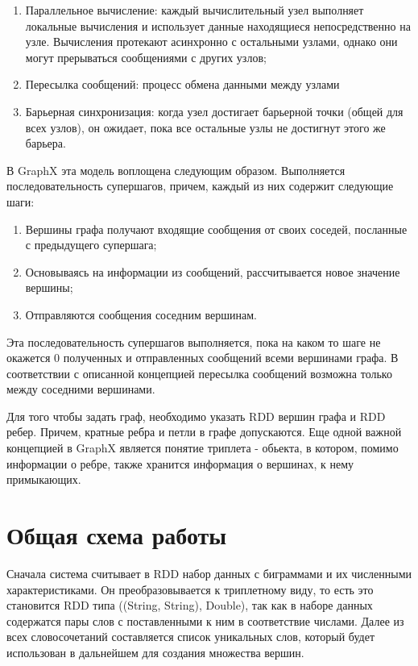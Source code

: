 \begin{enumerate}
  \item Параллельное вычисление: каждый вычислительный узел выполняет локальные
    вычисления и использует данные находящиеся непосредственно на узле.
    Вычисления протекают асинхронно с остальными узлами, однако они могут
    прерываться сообщениями с других узлов; 
  \item Пересылка сообщений: процесс обмена данными между узлами
  \item Барьерная синхронизация: когда узел достигает барьерной точки (общей для
    всех узлов), он ожидает, пока все остальные узлы не достигнут этого же барьера.
\end{enumerate}

В GraphX эта модель воплощена следующим образом. Выполняется последовательность
супершагов, причем, каждый из них содержит следующие шаги:

\begin{enumerate}
\item Вершины графа получают входящие сообщения от своих соседей, посланные с
  предыдущего супершага; 
\item Основываясь на информации из сообщений, рассчитывается новое значение
  вершины;
\item Отправляются сообщения соседним вершинам.
\end{enumerate}

Эта последовательность супершагов выполняется, пока на каком то шаге не окажется
0 полученных и отправленных сообщений всеми вершинами графа. В соответствии с
описанной концепцией пересылка сообщений возможна только между соседними
вершинами.

Для того чтобы задать граф, необходимо указать RDD вершин графа и RDD
ребер. Причем, кратные ребра и петли в графе допускаются. Еще одной важной
концепцией в GraphX является понятие триплета - обьекта, в котором, помимо
информации о ребре, также хранится информация о вершинах, к нему примыкающих.

\section{Общая схема работы}
Сначала система считывает в RDD набор данных с биграммами и их численными
характеристиками. Он преобразовывается к триплетному виду, то есть это
становится RDD типа ((String, String), Double), так как в наборе данных
содержатся пары слов с поставленными к ним в соответствие числами. Далее из всех
словосочетаний составляется список уникальных слов, который будет использован в
дальнейшем для создания множества вершин.

